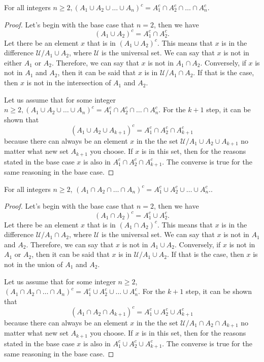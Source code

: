 \begin{proposition}
    For all integers $n \geq 2, (A_1 \cup A_2 \cup \dots \cup A_n)^c = A_1^c \cap A_2^c \cap \dots \cap A_n^c.$
\end{proposition}

\begin{proof}
    Let's begin with the base case that $n=2$, then we have
    $$(A_1 \cup A_2)^c = A^c_1 \cap A^c_2.$$
    Let there be an element $x$ that is in $(A_1 \cup A_2)^c.$  This means that  $x$ is in the difference $\mathcal{U} / A_1 \cup A_2$, where $\mathcal{U}$ is the universal set. We can say that $x$ is not in either $A_1$ or $A_2$. Therefore, we can say that $x$ is not in $A_1 \cap A_2$. Conversely, if $x$ is not in $A_1$ and $A_2$, then it can be said that $x$ is in $\mathcal{U}/A_1 \cap A_2.$ If that is the case, then $x$ is not in the intersection of $A_1$ and $A_2.$

    Let us assume that for some integer $n \geq 2, (A_1 \cup A_2 \cup \dots \cup A_n)^c = A_1^c \cap A_2^c \cap \dots \cap A_n^c.$ For the $k+1$ step, it can be shown that
    $$(A_1 \cup A_2 \cup A_{k+1})^c = A_1^c \cap A_2^c \cap A_{k+1}^c $$
    because there can always be an element $x$ in the the set $\mathcal{U} / A_1 \cup A_2 \cup A_{k+1} $ no matter what new set $A_{k+1}$ you choose. If $x$ is in this set, then for the reasons stated in the base case $x$ is also in $A_1^c \cap A_2^c \cap A_{k+1}^c.$ The converse is true for the same reasoning in the base case.
\end{proof}

\begin{proposition}
    For all integers $n \geq 2$, $(A_1 \cap A_2 \cap \dots \cap A_n)^c = A_1^c \cup A_2^c \cup \dots \cup A_n^c.$.
\end{proposition}

\begin{proof}
    Let's begin with the base case that $n=2$, then we have
    $$(A_1 \cap A_2)^c = A^c_1 \cup A^c_2.$$
    Let there be an element $x$ that is in $(A_1 \cap A_2)^c.$  This means that  $x$ is in the difference $\mathcal{U} / A_1 \cap A_2$, where $\mathcal{U}$ is the universal set. We can say that $x$ is not in $A_1$ and $A_2$. Therefore, we can say that $x$ is not in $A_1 \cup A_2$. Conversely, if $x$ is not in $A_1$ or $A_2$, then it can be said that $x$ is in $\mathcal{U}/A_1 \cup A_2.$ If that is the case, then $x$ is not in the union of $A_1$ and $A_2.$

    Let us assume that for some integer $n \geq 2$, $(A_1 \cap A_2 \cap \dots \cap A_n)^c = A_1^c \cup A_2^c \cup \dots \cup A_n^c.$ For the $k+1$ step, it can be shown that
    $$(A_1 \cap A_2 \cap A_{k+1})^c = A_1^c \cup A_2^c \cup A_{k+1}^c $$
    because there can always be an element $x$ in the the set $\mathcal{U} / A_1 \cap A_2 \cap A_{k+1} $ no matter what new set $A_{k+1}$ you choose. If $x$ is in this set, then for the reasons stated in the base case $x$ is also in $A_1^c \cup A_2^c \cup A_{k+1}^c.$ The converse is true for the same reasoning in the base case.
\end{proof}
